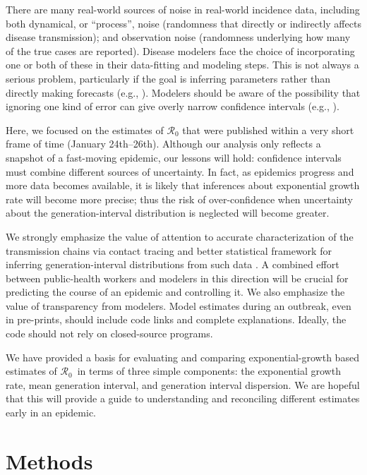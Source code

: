 \documentclass[12pt]{article}
\newcommand{\Rx}[1]{\ensuremath{{\mathcal R}_{#1}}}
\newcommand{\Ro}{\Rx{0}\xspace}
\begin{document}
There are many real-world sources of noise in real-world incidence data, including both dynamical, or ``process'', noise (randomness that directly or indirectly affects disease transmission); and observation noise (randomness underlying how many of the true cases are reported).  
Disease modelers face the choice of incorporating one or both of these in their data-fitting and modeling steps. 
This is not always a serious problem, particularly if the goal is inferring parameters rather than directly making forecasts (e.g., \cite{ma2014estimating}).
Modelers should be aware of the possibility that ignoring one kind of error can give overly narrow confidence intervals (e.g., \cite{king2015avoidable}).

Here, we focused on the estimates of \Ro that were published within a very short frame of time (January 24th--26th).
Although our analysis only reflects a snapshot of a fast-moving epidemic, our lessons will hold: confidence intervals must combine different sources of uncertainty. 
In fact, as epidemics progress and more data becomes available, it is likely that inferences about exponential growth rate will become more precise; thus the risk of over-confidence when uncertainty about the generation-interval distribution is neglected will become greater.

We strongly emphasize the value of attention to accurate characterization of the transmission chains via contact tracing and better statistical framework for inferring generation-interval distributions from such data \citep{britton2019estimation}.
A combined effort between public-health workers and modelers in this direction will be crucial for predicting the course of an epidemic and controlling it.
We also emphasize the value of transparency from modelers.
Model estimates during an outbreak, even in pre-prints, should include code links and complete explanations.
Ideally, the code should not rely on closed-source programs.

We have provided a basis for evaluating and comparing exponential-growth based estimates of \Ro\ in terms of three simple components: the exponential growth rate, mean generation interval, and generation interval dispersion. We are hopeful that this will provide a guide to understanding and reconciling different estimates early in an epidemic.

\section{Methods}
\end{document}
